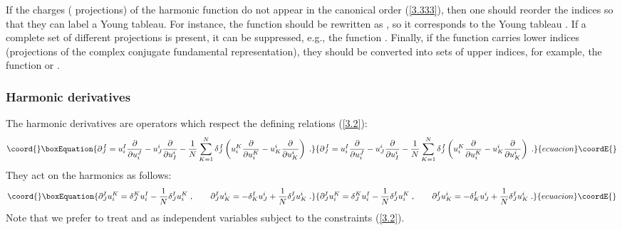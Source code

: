 \documentclass[a4paper,12pt]{article}
\begin{document}
If the charges (\coordHE{} projections) of the 
harmonic function do not appear in the canonical order 
(\ref{3.333}), then one should reorder the indices \coordHE{} 
so that they can label a Young tableau. For instance, the \coordHE{} 
function \coordHE{} should be rewritten as \coordHE{}, so it 
corresponds to the Young tableau \coordHE{}. If a complete set of  
\coordHE{} different projections is present, it can be suppressed, e.g., 
the \coordHE{} function \coordHE{}. Finally, if the function 
carries lower indices (projections of the complex conjugate 
fundamental representation), they should be converted into sets of 
\coordHE{} upper indices, for example,  the \coordHE{} function \coordHE{} or \coordHE{}.   
 
\subsubsection{Harmonic derivatives}

The harmonic derivatives are operators which  respect the defining 
relations (\ref{3.2}): 
\begin{equation}\coord{}\boxEquation{\label{3.4}
  \partial^{\,I}_J = u^I_i{\partial\over\partial u^J_i} - 
u^i_J{\partial\over\partial u^i_I} - {1\over 
N}\sum^N_{K=1}\delta^{\,I}_J \left(u^K_i{\partial\over\partial 
u^K_i} - u^i_K{\partial\over\partial u^i_K} \right)\;. 
}{\partial^{\,I}_J = u^I_i{\partial\over\partial u^J_i} - 
u^i_J{\partial\over\partial u^i_I} - {1\over 
N}\sum^N_{K=1}\delta^{\,I}_J \left(u^K_i{\partial\over\partial 
u^K_i} - u^i_K{\partial\over\partial u^i_K} \right)\;. 
}{ecuacion}\coordE{}\end{equation} 
They act on the harmonics as follows: 
\begin{equation}\coord{}\boxEquation{
\partial^I_J u^K_i=\delta^K_J u^I_i - {1\over N}\delta^{I}_J u^K_i \;,\qquad
\partial^I_J u^i_K=-\delta^I_K u^i_J +  {1\over N}\delta^{I}_J u^i_K\; .\label{3.5}
}{
\partial^I_J u^K_i=\delta^K_J u^I_i - {1\over N}\delta^{I}_J u^K_i \;,\qquad
\partial^I_J u^i_K=-\delta^I_K u^i_J +  {1\over N}\delta^{I}_J u^i_K\; .}{ecuacion}\coordE{}\end{equation}
Note that we prefer to treat \coordHE{} and \coordHE{} as independent 
variables subject to the constraints (\ref{3.2}).
\end{document}
